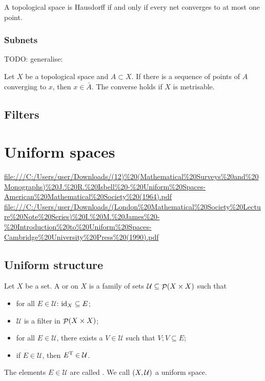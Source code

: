 \begin{proposition}
A topological space is Hausdorff \textup{if and only if} every net converges to at most one point.
\end{proposition}

\subsection{Subnets}

TODO: generalise:
\begin{proposition}
Let $X$ be a topological space and $A\subset X$. If there is a sequence of points of $A$ converging to $x$, then $x\in\bar{A}$. The converse holds if $X$ is metrisable.
\end{proposition}

\section{Filters}


\chapter{Uniform spaces}
\url{file:///C:/Users/user/Downloads/(12)%20(Mathematical%20Surveys%20and%20Monographs)%20J.%20R.%20Isbell%20-%20Uniform%20Spaces-American%20Mathematical%20Society%20(1964).pdf}
\url{file:///C:/Users/user/Downloads/(London%20Mathematical%20Society%20Lecture%20Note%20Series)%20I.%20M.%20James%20-%20Introduction%20to%20Uniform%20Spaces-Cambridge%20University%20Press%20(1990).pdf}

\section{Uniform structure}
\begin{definition}
Let $X$ be a set. A  or  on $X$ is a family of sets $\mathcal{U} \subseteq \mathop{\mathcal{P}}(X\times X)$ such that
\begin{itemize}
\item for all $E\in \mathcal{U}$: $\operatorname{id}_X \subseteq E$;
\item $\mathcal{U}$ is a filter in $\mathop{\mathcal{P}}(X\times X)$;
\item for all $E\in\mathcal{U}$, there exists a $V\in \mathcal{U}$ such that $V;V \subseteq E$;
\item if $E\in\mathcal{U}$, then $E^{\mathrm{T}}\in\mathcal{U}$.
\end{itemize}
The elements $E\in \mathcal{U}$ are called . We call $\left( X,\mathcal{U} \right)$ a uniform space.
\end{definition}

